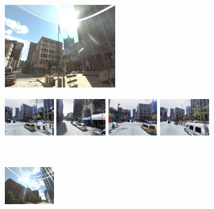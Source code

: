 \begin{figure}[t!]
        \begin{minipage}{0.34\linewidth}
            \centering
            \vspace{0mm}
            \includegraphics[height=36mm]{imgs/ex3/query.jpg}
        \end{minipage}
        \begin{minipage}{0.75\linewidth}
            \begin{minipage}{\linewidth} 
                \colorbox{myGreen}{\includegraphics[height=16mm]{imgs/ex3/FVsvm1.jpg}}
                \colorbox{myRed}{\includegraphics[height=16mm]{imgs/ex3/FVsvm2.jpg}}
                \colorbox{myGreen}{\includegraphics[height=16mm]{imgs/ex3/FVsvm5.jpg}}
                \colorbox{myGreen}{\includegraphics[height=16mm]{imgs/ex3/FVsvm4.jpg}}
            \end{minipage}
            \\
            \begin{minipage}{\linewidth}
                \colorbox{myRed}{\includegraphics[height=16mm]{imgs/ex3/FV1.jpg}}

\end{minipage}
\end{minipage}
\end{figure}
